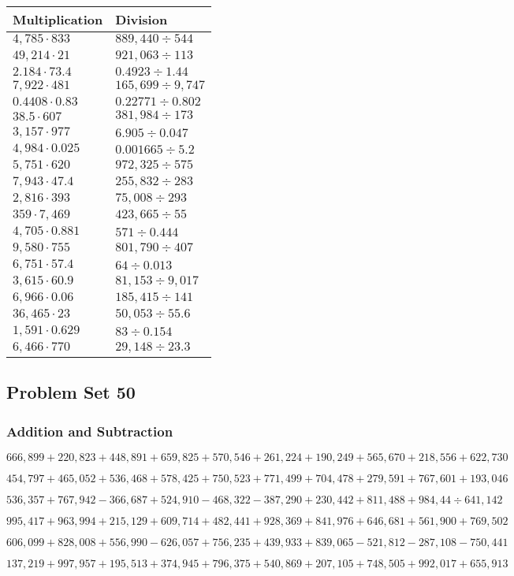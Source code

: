 \begin{longtable}[]{@{}ll@{}}
\toprule
Multiplication & Division\tabularnewline
\midrule
\endhead
\(4,785\cdot833\) & \(889,440÷544\)\tabularnewline
\(49,214\cdot21\) & \(921,063÷113\)\tabularnewline
\(2.184\cdot73.4\) & \(0.4923÷1.44\)\tabularnewline
\(7,922\cdot481\) & \(165,699÷9,747\)\tabularnewline
\(0.4408\cdot0.83\) & \(0.22771÷0.802\)\tabularnewline
\(38.5\cdot607\) & \(381,984÷173\)\tabularnewline
\(3,157\cdot977\) & \(6.905÷0.047\)\tabularnewline
\(4,984\cdot0.025\) & \(0.001665÷5.2\)\tabularnewline
\(5,751\cdot620\) & \(972,325÷575\)\tabularnewline
\(7,943\cdot47.4\) & \(255,832÷283\)\tabularnewline
\(2,816\cdot393\) & \(75,008÷293\)\tabularnewline
\(359\cdot7,469\) & \(423,665÷55\)\tabularnewline
\(4,705\cdot0.881\) & \(571÷0.444\)\tabularnewline
\(9,580\cdot755\) & \(801,790÷407\)\tabularnewline
\(6,751\cdot57.4\) & \(64÷0.013\)\tabularnewline
\(3,615\cdot60.9\) & \(81,153÷9,017\)\tabularnewline
\(6,966\cdot0.06\) & \(185,415÷141\)\tabularnewline
\(36,465\cdot23\) & \(50,053÷55.6\)\tabularnewline
\(1,591\cdot0.629\) & \(83÷0.154\)\tabularnewline
\(6,466\cdot770\) & \(29,148÷23.3\)\tabularnewline
\bottomrule
\end{longtable}

\hypertarget{problem-set-50-4}{%
\subsection{Problem Set 50}\label{problem-set-50-4}}

\hypertarget{addition-and-subtraction-355}{%
\subsubsection{Addition and
Subtraction}\label{addition-and-subtraction-355}}

\(666,899+220,823+448,891+659,825+570,546+261,224+190,249+565,670+218,556+ 622,730\)

\(454,797+465,052+536,468+578,425+750,523+771,499+704,478+279,591+767,601+193,046\)

\(536,357+767,942-366,687+524,910-468,322-387,290+230,442+811,488+984,44÷641,142\)

\(995,417+963,994+215,129+609,714+482,441+928,369+841,976+646,681+561,900+769,502\)

\(606,099+828,008+556,990-626,057+756,235+439,933+839,065-521,812-287,108-750,441\)

\(137,219+997,957+195,513+374,945+796,375+540,869+207,105+748,505+992,017+655,913\)

